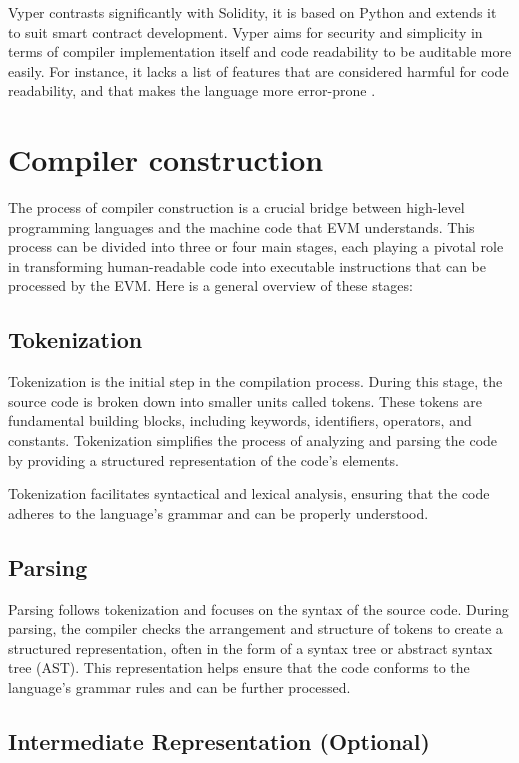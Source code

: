 Vyper contrasts significantly with Solidity, it is based on Python and extends it to suit smart contract development. Vyper aims for security and simplicity in terms of compiler implementation itself and code readability to be auditable more easily. For instance, it lacks a list of features that are considered harmful for code readability, and that makes the language more error-prone \cite{VyperDescription}.

\section{Compiler construction}
\label{sec:cc}

The process of compiler construction is a crucial bridge between high-level programming languages and the machine code that EVM understands. This process can be divided into three or four main stages, each playing a pivotal role in transforming human-readable code into executable instructions that can be processed by the EVM. Here is a general overview of these stages:

\subsection{Tokenization}
Tokenization is the initial step in the compilation process. During this stage, the source code is broken down into smaller units called tokens. These tokens are fundamental building blocks, including keywords, identifiers, operators, and constants. Tokenization simplifies the process of analyzing and parsing the code by providing a structured representation of the code's elements.

Tokenization facilitates syntactical and lexical analysis, ensuring that the code adheres to the language's grammar and can be properly understood.

\subsection{Parsing}

Parsing follows tokenization and focuses on the syntax of the source code. During parsing, the compiler checks the arrangement and structure of tokens to create a structured representation, often in the form of a syntax tree or abstract syntax tree (AST). This representation helps ensure that the code conforms to the language's grammar rules and can be further processed.

\subsection{Intermediate Representation (Optional)}

